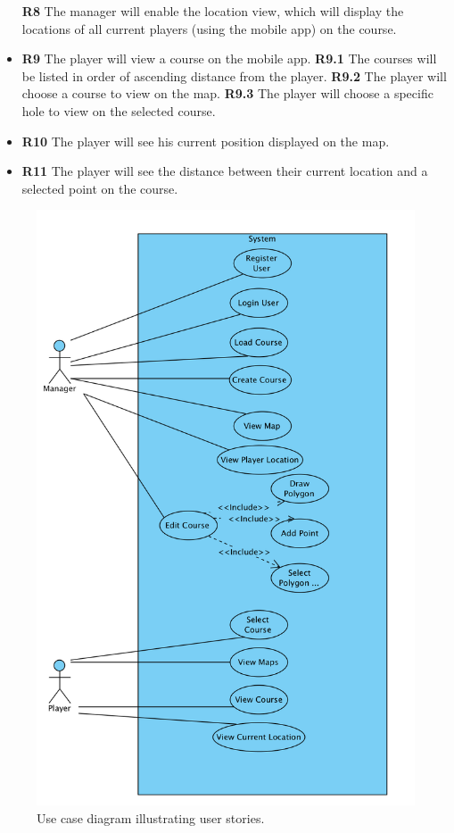 \documentclass{article}
\begin{document}
\begin{itemize}
            \textbf{R8} The manager will enable the location view, which will
            display the locations of all current players (using the mobile app)
            on the course.
        \item
            \textbf{R9} The player will view a course on the mobile app.
            \subitem \textbf{R9.1} The courses will be listed in order of
            ascending distance from the player.
            \subitem \textbf{R9.2} The player will choose a course to view on
            the map.
            \subitem \textbf{R9.3} The player will choose a specific hole to
            view on the selected course.
        \item
            \textbf{R10} The player will see his current position displayed on
            the map.
        \item
            \textbf{R11} The player will see the distance between their current
            location and a selected point on the course.
    \end{itemize}
    

    \begin{figure}[h!]
        \centering
        \includegraphics[scale=0.6]{UsecaseDiagram}
        \caption{Use case diagram illustrating user stories.}
        \label{fig:usecase}
    \end{figure}
\end{document}
